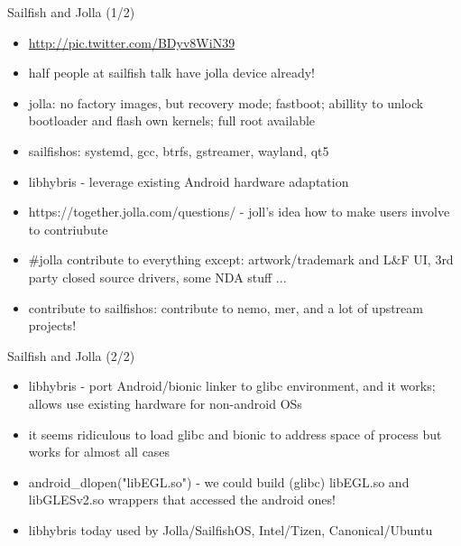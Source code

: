 \documentclass[aspectratio=169]{beamer}
\begin{document}
\begin{frame}{Sailfish and Jolla (1/2)}
  \begin{itemize}
  \item \url{http://pic.twitter.com/BDyv8WiN39}
  \item half people at sailfish talk have jolla device already!
  \item jolla: no factory images, but recovery mode; fastboot; abillity to unlock bootloader and flash own kernels; full root available
  \item sailfishos: systemd, gcc, btrfs, gstreamer, wayland, qt5
  \item libhybris - leverage existing Android hardware adaptation
  \item https://together.jolla.com/questions/  - joll's idea how to make users involve to contriubute
  \item \#jolla contribute to everything  except: artwork/trademark and L\&F UI, 3rd party closed source drivers, some NDA stuff ...
  \item contribute to sailfishos: contribute to nemo, mer, and a lot of upstream projects!
  \end{itemize}
\end{frame}  
  
\begin{frame}{Sailfish and Jolla (2/2)}
  \begin{itemize}
  \item libhybris - port Android/bionic linker to glibc environment, and it works; allows use existing hardware for non-android OSs
  \item it seems ridiculous to load glibc and bionic to address space of process but works for almost all cases
  \item android\_dlopen("libEGL.so") - we could build (glibc) libEGL.so and libGLESv2.so wrappers that accessed the android ones!
  \item libhybris today used by Jolla/SailfishOS, Intel/Tizen, Canonical/Ubuntu
  \end{itemize}
\end{frame}  
  
\end{document}
